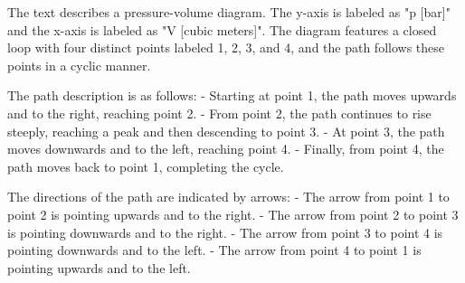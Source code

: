 The text describes a pressure-volume diagram. The y-axis is labeled as "p [bar]" and the x-axis is labeled as "V [cubic meters]". The diagram features a closed loop with four distinct points labeled 1, 2, 3, and 4, and the path follows these points in a cyclic manner.

The path description is as follows:
- Starting at point 1, the path moves upwards and to the right, reaching point 2.
- From point 2, the path continues to rise steeply, reaching a peak and then descending to point 3.
- At point 3, the path moves downwards and to the left, reaching point 4.
- Finally, from point 4, the path moves back to point 1, completing the cycle.

The directions of the path are indicated by arrows:
- The arrow from point 1 to point 2 is pointing upwards and to the right.
- The arrow from point 2 to point 3 is pointing downwards and to the right.
- The arrow from point 3 to point 4 is pointing downwards and to the left.
- The arrow from point 4 to point 1 is pointing upwards and to the left.